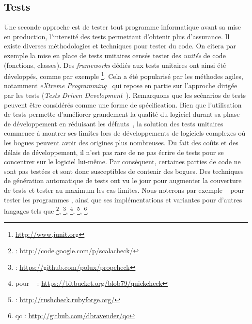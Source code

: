 \subsection{Tests}
\label{ch:verification:subsec:test}

Une seconde approche est de tester tout programme informatique avant sa mise en
production, l'intensité des tests permettant d'obtenir plus d'assurance. Il
existe diverses méthodologies et techniques pour tester du code. On citera par
exemple la mise en place de tests unitaires censés tester des \emph{unités} de
code (fonctions, classes). Des \emph{frameworks} dédiés aux tests unitaires ont
ainsi été développés, comme par exemple
{\junit}\footnote{\url{http://www.junit.org}}. Cela a été popularisé par les
méthodes agiles, notamment \emph{eXtreme Programming}~\cite{Beck2004} qui
repose en partie sur l'approche dirigée par les tests (\emph{Tests Driven
Development}~\cite{Beck2003}). Remarquons que les scénarios de tests peuvent
être considérés comme une forme de spécification. Bien que l'utilisation de
tests permette d'améliorer grandement la qualité du logiciel durant sa phase de
développement en réduisant les défauts~\cite{Williams2003}, la solution des
tests unitaires commence à montrer ses limites lors de développements de
logiciels complexes où les bogues peuvent avoir des origines plus nombreuses.
Du fait des coûts et des délais de développement, il n'est pas rare de ne pas
écrire de tests pour se concentrer sur le logiciel lui-même. Par conséquent,
certaines parties de code ne sont pas testées et sont donc susceptibles de
contenir des bogues. Des techniques de génération automatique de tests ont vu
le jour pour augmenter la couverture de tests et tester au maximum les cas
limites. Nous noterons par exemple 
{\quickcheck}~\cite{Claessen2000,Hughes2010} pour tester les programmes
{\haskell}, ainsi que ses implémentations et variantes pour d'autres langages
% 
  tels que {\scala}\footnote{{\scalacheck} :
  \url{http://code.google.com/p/scalacheck/}}, {\dart}\footnote{{\propcheck} :
  \url{https://github.com/polux/propcheck}}, {\java}\footnote{{\quickcheck}
  pour {\java}~\cite{Earle2013} :
  \url{https://bitbucket.org/blob79/quickcheck}}, {\ruby}\footnote{{\rushcheck}
  : \url{http://rushcheck.rubyforge.org/}}, {\python}\footnote{qc :
    \url{http://github.com/dbravender/qc}}, {\etc}



